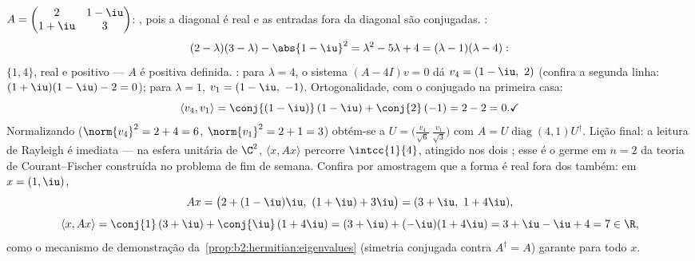 \begin{example}\label{ex:b2:hermitian:pdrun}
$A = \begin{pmatrix} 2 & 1-\iu\\ 1+\iu & 3\end{pmatrix}$:
, pois a diagonal é real e as entradas fora da
diagonal são conjugadas. :
\[
(2-\lambda)(3-\lambda) - \abs{1-\iu}^2
= \lambda^2 - 5\lambda + 4
= (\lambda - 1)(\lambda - 4) :
\]
 $\{1, 4\}$, real e positivo --- $A$ é positiva
definida. : para $\lambda = 4$, o sistema $(A -
4I)v = 0$ dá $v_4 = (1 - \iu,\ 2)$ (confira a segunda linha:
$(1+\iu)(1-\iu) - 2 = 0$); para $\lambda = 1$, $v_1 = (1 - \iu,\
-1)$. Ortogonalidade, com o conjugado na primeira casa:
\[
\langle v_4, v_1\rangle
= \conj{(1-\iu)}\,(1-\iu) + \conj{2}\,(-1)
= 2 - 2 = 0 . \checkmark
\]
Normalizando ($\norm{v_4}^2 = 2 + 4 = 6$, $\norm{v_1}^2 = 2 + 1
= 3$) obtém-se a  $U = \bigl(\frac{v_4}{\sqrt6}\
\frac{v_1}{\sqrt3}\bigr)$ com $A =
U\operatorname{diag}(4,1)U^\dagger$. Lição final: a
leitura de Rayleigh é imediata --- na esfera unitária de
$\C^2$, $\langle x, Ax\rangle$ percorre $\intcc{1}{4}$,
atingido nos dois ; esse é o germe em $n = 2$ da
teoria de Courant--Fischer construída no problema de fim de semana.
Confira por amostragem que a forma é real fora dos  também: em
$x = (1, \iu)$,
\[
Ax = \bigl(2 + (1-\iu)\iu,\ (1+\iu) + 3\iu\bigr)
= (3 + \iu,\ 1 + 4\iu),
\]
\[
\langle x, Ax\rangle = \conj{1}\,(3+\iu) +
\conj{\iu}\,(1+4\iu)
= (3 + \iu) + (-\iu)(1 + 4\iu) = 3 + \iu - \iu + 4 = 7 \in
\R ,
\]
como o mecanismo de demonstração da~\cref{prop:b2:hermitian:eigenvalues}
(simetria conjugada contra $A^\dagger = A$) garante para
todo $x$.
\end{example}

